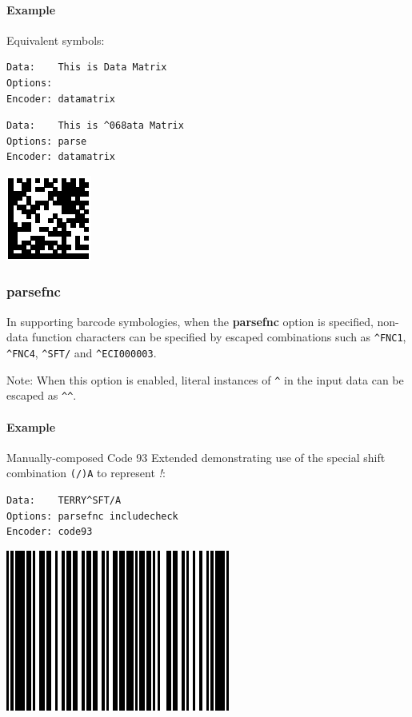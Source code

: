 \hypertarget{example-27}{%
\paragraph{Example}\label{example-27}}

Equivalent symbols:

\begin{verbatim}
Data:    This is Data Matrix
Options: 
Encoder: datamatrix
\end{verbatim}

\begin{verbatim}
Data:    This is ^068ata Matrix
Options: parse
Encoder: datamatrix
\end{verbatim}

\includegraphics{images/optparse.eps}

\hypertarget{parsefnc}{%
\subsubsection{parsefnc}\label{parsefnc}}

In supporting barcode symbologies, when the \textbf{parsefnc} option is
specified, non-data function characters can be specified by escaped
combinations such as \texttt{\^{}FNC1}, \texttt{\^{}FNC4},
\texttt{\^{}SFT/} and \texttt{\^{}ECI000003}.

Note: When this option is enabled, literal instances of \texttt{\^{}} in
the input data can be escaped as \texttt{\^{}\^{}}.

\hypertarget{example-28}{%
\paragraph{Example}\label{example-28}}

Manually-composed Code 93 Extended demonstrating use of the special
shift combination \texttt{(/)A} to represent \emph{!}:

\begin{verbatim}
Data:    TERRY^SFT/A
Options: parsefnc includecheck
Encoder: code93
\end{verbatim}

\includegraphics{images/optparsefnc.eps}

